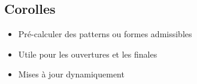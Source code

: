 	\subsection{Corolles}
	\begin{frame}
		\begin{itemize}[<+->]
			\item Pré-calculer des patterns ou formes admissibles
			\item Utile pour les ouvertures et les finales
			\item Mises à jour dynamiquement
		\end{itemize}
		\begin{minipage}{0.47\textwidth}
			\begin{figure}

\end{figure}
\end{minipage}
\end{frame}

